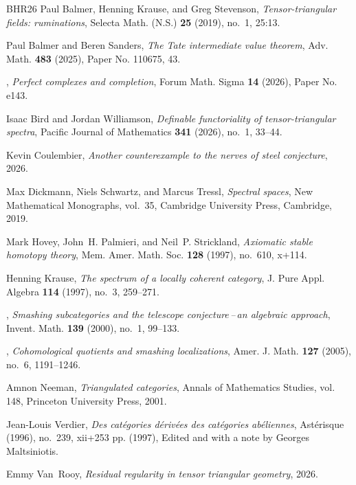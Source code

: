 \documentclass[11pt]{amsart}
\numberwithin{equation}{section} %
\theoremstyle{plain}
\theoremstyle{definition}
\theoremstyle{remark}
\begin{document}
\begin{thebibliography}{BHR26}
Paul Balmer, Henning Krause, and Greg Stevenson, \emph{Tensor-triangular fields: ruminations}, Selecta Math. (N.S.) \textbf{25} (2019), no.~1, 25:13. 

Paul Balmer and Beren Sanders, \emph{The {T}ate intermediate value theorem}, Adv. Math. \textbf{483} (2025), Paper No. 110675, 43. 

\bysame, \emph{Perfect complexes and completion}, Forum Math. Sigma \textbf{14} (2026), Paper No. e143. 

Isaac Bird and Jordan Williamson, \emph{Definable functoriality of tensor-triangular spectra}, Pacific Journal of Mathematics \textbf{341} (2026), no.~1, 33–44.

Kevin Coulembier, \emph{Another counterexample to the nerves of steel conjecture}, 2026.

Max Dickmann, Niels Schwartz, and Marcus Tressl, \emph{Spectral spaces}, New Mathematical Monographs, vol.~35, Cambridge University Press, Cambridge, 2019. 

Mark Hovey, John~H. Palmieri, and Neil~P. Strickland, \emph{Axiomatic stable homotopy theory}, Mem. Amer. Math. Soc. \textbf{128} (1997), no.~610, x+114.

Henning Krause, \emph{The spectrum of a locally coherent category}, J. Pure Appl. Algebra \textbf{114} (1997), no.~3, 259--271. 

\bysame, \emph{Smashing subcategories and the telescope con\-jec\-ture\,--\,an algebraic approach}, Invent. Math. \textbf{139} (2000), no.~1, 99--133.

\bysame, \emph{Cohomological quotients and smashing localizations}, Amer. J. Math. \textbf{127} (2005), no.~6, 1191--1246. 

Amnon Neeman, \emph{Triangulated categories}, Annals of Mathematics Studies, vol. 148, Princeton University Press, 2001.

Jean-Louis Verdier, \emph{Des cat\'egories d\'eriv\'ees des cat\'egories ab\'eliennes}, Ast\'erisque (1996), no.~239, xii+253 pp. (1997), Edited and with a note by Georges Maltsiniotis. 

Emmy Van~Rooy, \emph{Residual regularity in tensor triangular geometry}, 2026.

\end{thebibliography}


\end{document}
